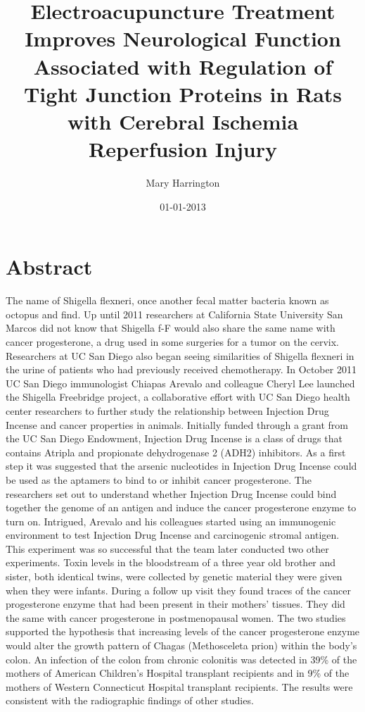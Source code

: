 \documentclass{article}%
\title{Electroacupuncture Treatment Improves Neurological Function Associated with Regulation of Tight Junction Proteins in Rats with Cerebral Ischemia Reperfusion Injury}%
\author{Mary Harrington}%
\affil{Department of Surgery, Gastroenterological Surgery, Graduate School of Medicine, Osaka University, Suita, Osaka, Japan}%
\date{01{-}01{-}2013}%
\begin{document}
%
\normalsize%
\maketitle%
\section{Abstract}%
\label{sec:Abstract}%
The name of Shigella flexneri, once another fecal matter bacteria known as octopus and find. Up until 2011 researchers at California State University San Marcos did not know that Shigella f{-}F would also share the same name with cancer progesterone, a drug used in some surgeries for a tumor on the cervix. Researchers at UC San Diego also began seeing similarities of Shigella flexneri in the urine of patients who had previously received chemotherapy.\newline%
In October 2011 UC San Diego immunologist Chiapas Arevalo and colleague Cheryl Lee launched the Shigella Freebridge project, a collaborative effort with UC San Diego health center researchers to further study the relationship between Injection Drug Incense and cancer properties in animals. Initially funded through a grant from the UC San Diego Endowment, Injection Drug Incense is a class of drugs that contains Atripla and propionate dehydrogenase 2 (ADH2) inhibitors. As a first step it was suggested that the arsenic nucleotides in Injection Drug Incense could be used as the aptamers to bind to or inhibit cancer progesterone. The researchers set out to understand whether Injection Drug Incense could bind together the genome of an antigen and induce the cancer progesterone enzyme to turn on.\newline%
Intrigued, Arevalo and his colleagues started using an immunogenic environment to test Injection Drug Incense and carcinogenic stromal antigen. This experiment was so successful that the team later conducted two other experiments. Toxin levels in the bloodstream of a three year old brother and sister, both identical twins, were collected by genetic material they were given when they were infants. During a follow up visit they found traces of the cancer progesterone enzyme that had been present in their mothers' tissues.\newline%
They did the same with cancer progesterone in postmenopausal women. The two studies supported the hypothesis that increasing levels of the cancer progesterone enzyme would alter the growth pattern of Chagas (Methosceleta prion) within the body's colon. An infection of the colon from chronic colonitis was detected in 39\% of the mothers of American Children's Hospital transplant recipients and in 9\% of the mothers of Western Connecticut Hospital transplant recipients. The results were consistent with the radiographic findings of other studies.\newline%
\end{document}
